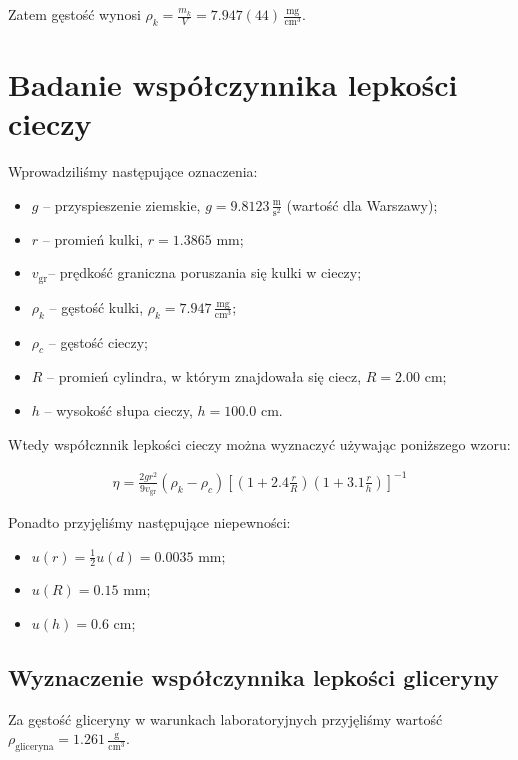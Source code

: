\documentclass[a4paper]{article}
\begin{document}
Zatem gęstość wynosi $\rho_k = \frac{m_k}{V} = 7.947 (44) \, \frac{\text{mg}}{\text{cm}^3}$.

\section{Badanie współczynnika lepkości cieczy}

\newcommand{\vgr}{\ensuremath{v_{\text{gr}}}}

Wprowadziliśmy następujące oznaczenia:

\begin{itemize}
	\item $g$ -- przyspieszenie ziemskie, $g = 9.8123 \, \frac{\text{m}}{\text{s}^2}$ (wartość dla Warszawy);
	\item $r$ -- promień kulki, $r = 1.3865$ mm;
	\item \vgr -- prędkość graniczna poruszania się kulki w cieczy;
	\item $\rho_k$ -- gęstość kulki, $\rho_k = 7.947 \, \frac{\text{mg}}{\text{cm}^3}$;
	\item $\rho_c$ -- gęstość cieczy;
	\item $R$ -- promień cylindra, w którym znajdowała się ciecz, $R = 2.00$ cm;
	\item $h$ -- wysokość słupa cieczy, $h = 100.0$ cm.
\end{itemize}

Wtedy współcznnik lepkości cieczy można wyznaczyć używając poniższego wzoru:

\begin{align}
\eta = \frac{2 g r^2}{9 v_{\text{gr}}}(\rho_k - \rho_c)\left[(1 + 2.4 \frac r R)(1 + 3.1 \frac r h)\right]^{-1} \label{eq_lepkosc}
\end{align}

Ponadto przyjęliśmy następujące niepewności:

\begin{itemize}
	\item $u(r) = \frac 1 2 u(d) = 0.0035$ mm;
	\item $u(R) = 0.15$ mm; %
	\item $u(h) = 0.6$ cm;
\end{itemize}

\subsection{Wyznaczenie współczynnika lepkości gliceryny}

Za gęstość gliceryny w warunkach laboratoryjnych przyjęliśmy wartość $\rho_\text{gliceryna} = 1.261 \, \frac{\text{g}}{\text{cm}^3}$.
\end{document}
